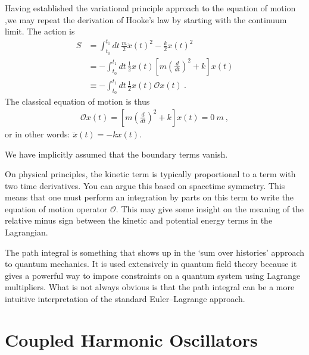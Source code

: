 \documentclass[12pt, oneside]{report}    %
\let\oldsection\section
\def\section{%
  \setcounter{sidenote}{1}%
  \oldsection
}
\begin{document}
\begin{example}
Having established the variational principle approach to the equation of motion ,we may repeat the derivation of Hooke's law by starting with the continuum limit. The action is
\begin{align}
    S&= \int_{t_0}^{t_1} dt\, \frac{m}{2}\dot x(t)^2 - \frac{k}{2}x(t)^2
    \\&
    = -\int_{t_0}^{t_1} dt\, \frac{1}{2}x(t)
    \left[m\left(\frac{d}{dt}\right)^2 + k\right]x(t)
    \\&    
    \equiv -\int_{t_0}^{t_1} dt\, \frac{1}{2} x(t) \mathcal O x(t) \ .
\end{align}
The classical equation of motion is thus
\begin{align}
    \mathcal Ox(t) = \left[m\left(\frac{d}{dt}\right)^2 + k\right]x(t) = 0 \ m \ ,
\end{align}
or in other words: $\ddot x(t) = -kx(t)$.
\end{example}
We have implicitly assumed that the boundary terms vanish.

On physical principles, the kinetic term is typically proportional to a term with two time derivatives. You can argue this based on spacetime symmetry. This means that one must perform an integration by parts on this term to write the equation of motion operator $\mathcal O$. This may give some insight on the meaning of the relative minus sign between the kinetic and potential energy terms in the Lagrangian. 

The path integral is something that shows up in the `sum over histories' approach to quantum mechanics. It is used extensively in quantum field theory because it gives a powerful way to impose constraints on a quantum system using Lagrange multipliers. What is not always obvious is that the path integral can be a more intuitive interpretation of the standard Euler--Lagrange approach. 


\section{Coupled Harmonic Oscillators}
\end{document}
